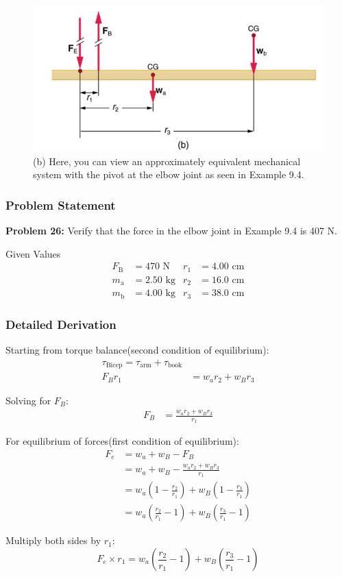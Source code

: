\documentclass{beamer}
\begin{document}
\begin{frame}
\begin{figure}
    \centering
    \includegraphics[width=0.7\linewidth]{Screenshot 2024-11-04 122703.png}
    \caption{ (b) Here, you can view an approximately equivalent mechanical system with the pivot at the elbow joint as seen in Example 9.4.}
\end{figure}
\end{frame}

\begin{frame}
\frametitle{Problem Statement}
\textbf{Problem 26:} Verify that the force in the elbow joint in Example 9.4 is 407 N.

\begin{block}{Given Values}
\begin{align*}
F_{\text{B}} &= 470 \text{ N} & r_1 &= 4.00 \text{ cm} \\
m_{\text{a}} &= 2.50 \text{ kg} & r_2 &= 16.0 \text{ cm} \\
m_{\text{b}} &= 4.00 \text{ kg} & r_3 &= 38.0 \text{ cm}
\end{align*}
\end{block}
\end{frame}


\begin{frame}
\frametitle{Detailed Derivation}

Starting from torque balance(second condition of equilibrium):
\begin{align*}
\tau_{\text{Bicep}}=\tau_{\text{arm}}+\tau_{\text{book}} \\
F_B r_1 &= w_a r_2 + w_B r_3
\end{align*}

Solving for $F_B$:
\begin{align*}
F_B &= \frac{w_a r_2 + w_B r_3}{r_1}
\end{align*}

For equilibrium of forces(first condition of equilibrium):
\begin{align*}
F_e &= w_a + w_B - F_B \\
&= w_a + w_B - \frac{w_a r_2 + w_B r_3}{r_1} \\
&= w_a\left(1 - \frac{r_2}{r_1}\right) + w_B\left(1 - \frac{r_3}{r_1}\right) \\
&= w_a\left(\frac{r_2}{r_1} - 1\right) + w_B\left(\frac{r_3}{r_1} - 1\right)
\end{align*}
\end{frame}
\begin{frame}
Multiply both sides by $r_1$:
\begin{equation*}
F_e \times r_1 = w_a\left(\frac{r_2}{r_1} - 1\right) + w_B\left(\frac{r_3}{r_1} - 1\right)
\end{equation*}
\end{frame}
\end{document}
